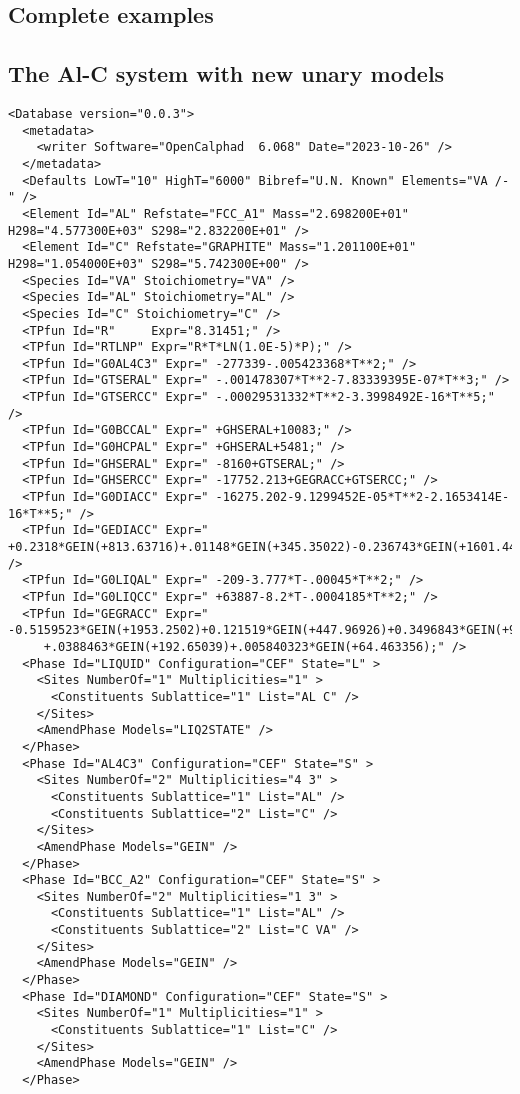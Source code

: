 \documentclass{article}
\begin{document}
\begin{appendices}
\newpage

\setcounter{equation}{0}
\renewcommand{\theequation}{D\arabic{equation}}
\setcounter{figure}{0}
\renewcommand{\thefigure}{D\arabic{figure}}

\section{Complete examples}\label{sec:complete}

\subsection{The Al-C system with new unary models}\label{sec:alc}

{\small
\begin{verbatim}
<Database version="0.0.3">
  <metadata>
    <writer Software="OpenCalphad  6.068" Date="2023-10-26" />
  </metadata>
  <Defaults LowT="10" HighT="6000" Bibref="U.N. Known" Elements="VA /-" />
  <Element Id="AL" Refstate="FCC_A1" Mass="2.698200E+01" H298="4.577300E+03" S298="2.832200E+01" />
  <Element Id="C" Refstate="GRAPHITE" Mass="1.201100E+01" H298="1.054000E+03" S298="5.742300E+00" />
  <Species Id="VA" Stoichiometry="VA" />
  <Species Id="AL" Stoichiometry="AL" />
  <Species Id="C" Stoichiometry="C" />
  <TPfun Id="R"     Expr="8.31451;" />
  <TPfun Id="RTLNP" Expr="R*T*LN(1.0E-5)*P);" />
  <TPfun Id="G0AL4C3" Expr=" -277339-.005423368*T**2;" /> 
  <TPfun Id="GTSERAL" Expr=" -.001478307*T**2-7.83339395E-07*T**3;" /> 
  <TPfun Id="GTSERCC" Expr=" -.00029531332*T**2-3.3998492E-16*T**5;" /> 
  <TPfun Id="G0BCCAL" Expr=" +GHSERAL+10083;" /> 
  <TPfun Id="G0HCPAL" Expr=" +GHSERAL+5481;" /> 
  <TPfun Id="GHSERAL" Expr=" -8160+GTSERAL;" /> 
  <TPfun Id="GHSERCC" Expr=" -17752.213+GEGRACC+GTSERCC;" /> 
  <TPfun Id="G0DIACC" Expr=" -16275.202-9.1299452E-05*T**2-2.1653414E-16*T**5;" /> 
  <TPfun Id="GEDIACC" Expr=" +0.2318*GEIN(+813.63716)+.01148*GEIN(+345.35022)-0.236743*GEIN(+1601.4467);" /> 
  <TPfun Id="G0LIQAL" Expr=" -209-3.777*T-.00045*T**2;" /> 
  <TPfun Id="G0LIQCC" Expr=" +63887-8.2*T-.0004185*T**2;" /> 
  <TPfun Id="GEGRACC" Expr=" -0.5159523*GEIN(+1953.2502)+0.121519*GEIN(+447.96926)+0.3496843*GEIN(+947.01605)
     +.0388463*GEIN(+192.65039)+.005840323*GEIN(+64.463356);" /> 
  <Phase Id="LIQUID" Configuration="CEF" State="L" >
    <Sites NumberOf="1" Multiplicities="1" >
      <Constituents Sublattice="1" List="AL C" />
    </Sites>
    <AmendPhase Models="LIQ2STATE" />
  </Phase>
  <Phase Id="AL4C3" Configuration="CEF" State="S" >
    <Sites NumberOf="2" Multiplicities="4 3" >
      <Constituents Sublattice="1" List="AL" />
      <Constituents Sublattice="2" List="C" />
    </Sites>
    <AmendPhase Models="GEIN" />
  </Phase>
  <Phase Id="BCC_A2" Configuration="CEF" State="S" >
    <Sites NumberOf="2" Multiplicities="1 3" >
      <Constituents Sublattice="1" List="AL" />
      <Constituents Sublattice="2" List="C VA" />
    </Sites>
    <AmendPhase Models="GEIN" />
  </Phase>
  <Phase Id="DIAMOND" Configuration="CEF" State="S" >
    <Sites NumberOf="1" Multiplicities="1" >
      <Constituents Sublattice="1" List="C" />
    </Sites>
    <AmendPhase Models="GEIN" />
  </Phase>



\end{verbatim}}
\end{appendices}
\end{document}
